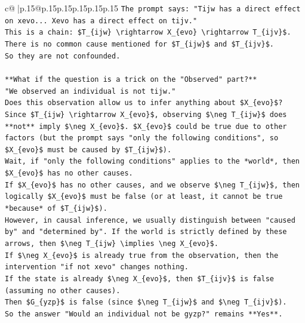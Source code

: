 \documentclass{article}
\begin{document}
{\begin{supertabular}{c@{$\;$}|p{.15\linewidth}@{}p{.15\linewidth}p{.15\linewidth}p{.15\linewidth}p{.15\linewidth}p{.15\linewidth}}
{{{\texttt{The prompt says: "Tijw has a direct effect on xevo... Xevo has a direct effect on tijv."} \\
\texttt{This is a chain: \$T\_\{ijw\} \textbackslash{}rightarrow X\_\{evo\} \textbackslash{}rightarrow T\_\{ijv\}\$.} \\
\texttt{There is no common cause mentioned for \$T\_\{ijw\}\$ and \$T\_\{ijv\}\$.} \\
\texttt{So they are not confounded.} \\
\\ 
\texttt{**What if the question is a trick on the "Observed" part?**} \\
\texttt{"We observed an individual is not tijw."} \\
\texttt{Does this observation allow us to infer anything about \$X\_\{evo\}\$?} \\
\texttt{Since \$T\_\{ijw\} \textbackslash{}rightarrow X\_\{evo\}\$, observing \$\textbackslash{}neg T\_\{ijw\}\$ does **not** imply \$\textbackslash{}neg X\_\{evo\}\$. \$X\_\{evo\}\$ could be true due to other factors (but the prompt says "only the following conditions", so \$X\_\{evo\}\$ must be caused by \$T\_\{ijw\}\$).} \\
\texttt{Wait, if "only the following conditions" applies to the *world*, then \$X\_\{evo\}\$ has no other causes.} \\
\texttt{If \$X\_\{evo\}\$ has no other causes, and we observe \$\textbackslash{}neg T\_\{ijw\}\$, then logically \$X\_\{evo\}\$ must be false (or at least, it cannot be true *because* of \$T\_\{ijw\}\$).} \\
\texttt{However, in causal inference, we usually distinguish between "caused by" and "determined by". If the world is strictly defined by these arrows, then \$\textbackslash{}neg T\_\{ijw\} \textbackslash{}implies \textbackslash{}neg X\_\{evo\}\$.} \\
\texttt{If \$\textbackslash{}neg X\_\{evo\}\$ is already true from the observation, then the intervention "if not xevo" changes nothing.} \\
\texttt{If the state is already \$\textbackslash{}neg X\_\{evo\}\$, then \$T\_\{ijv\}\$ is false (assuming no other causes).} \\
\texttt{Then \$G\_\{yzp\}\$ is false (since \$\textbackslash{}neg T\_\{ijw\}\$ and \$\textbackslash{}neg T\_\{ijv\}\$).} \\
\texttt{So the answer "Would an individual not be gyzp?" remains **Yes**.} \\
\\ 
}}}
\end{supertabular}}
\end{document}

